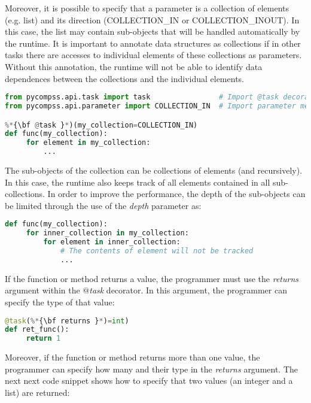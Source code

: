 Moreover, it is possible to specify that a parameter is a collection of elements (e.g. list) and its
direction (COLLECTION\_IN or COLLECTION\_INOUT). 
In this case, the list may contain sub-objects that will be handled automatically by the runtime. 
It is important to annotate data structures as collections if in other tasks there are accesses to individual elements of these collections as parameters. 
Without this annotation, the runtime will not be able to identify data dependences between the collections and the individual elements. 


\begin{lstlisting}[language=python]
from pycompss.api.task import task                # Import @task decorator
from pycompss.api.parameter import COLLECTION_IN  # Import parameter metadata for the @task decorator

%*{\bf @task }*)(my_collection=COLLECTION_IN)
def func(my_collection):
     for element in my_collection:
         ...
\end{lstlisting}

The sub-objects of the collection can be collections of elements (and recursively). In this case, the runtime also keeps track of all elements contained in all sub-collections.
In order to improve the performance, the depth of the sub-objects can be limited through the use of the {\it depth} parameter as:

\begin{lstlisting}[language=python]
%*{\bf @task }*)(my_collection={Type: COLLECTION_IN, Depth: 2})
def func(my_collection):
     for inner_collection in my_collection:
         for element in inner_collection:
             # The contents of element will not be tracked
             ...
\end{lstlisting}

If the function or method returns a value, the programmer must use the {\it returns}  argument within
the {\it $@$task} decorator. In this argument, the programmer can specify the type of that value:

\begin{lstlisting}[language=python]
@task(%*{\bf returns }*)=int)
def ret_func():
     return 1
\end{lstlisting}

Moreover, if the function or method returns more than one value, the programmer can specify how many 
and their type in the {\it returns} argument. The next next code snippet shows how to specify that two 
values (an integer and a list) are returned:

